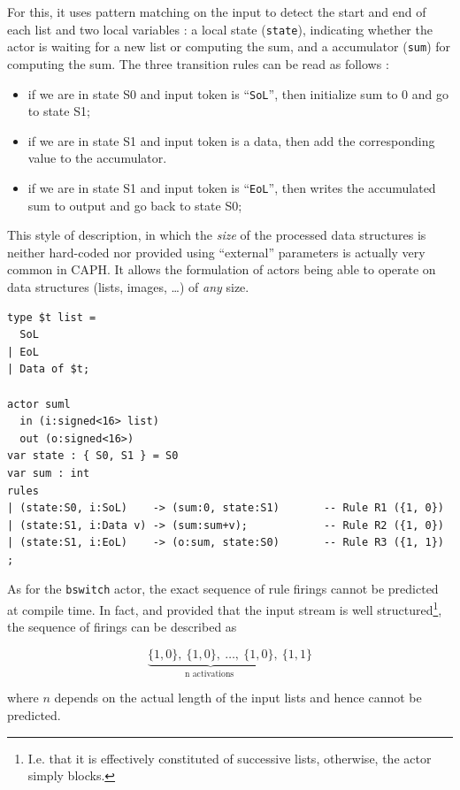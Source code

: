For this, it uses pattern
matching on the input to detect the start and end of each list and two local variables : a local
state (\texttt{state}), indicating whether the actor is waiting for a new list or computing the sum,
and a accumulator (\texttt{sum}) for computing the sum. The three transition rules can be read as
follows :
\begin{itemize}
\item if we are in state S0 and input token is ``\verb|SoL|'', then initialize sum to 0 and go to state S1;
\item if we are in state S1 and input token is a data, then add the corresponding value to the accumulator.
\item if we are in state S1 and input token is ``\verb|EoL|'', then writes the accumulated sum to output and
  go back to state S0;
\end{itemize}
This style of description, in which the \emph{size} of the processed data structures is neither
hard-coded nor provided using ``external'' parameters is actually very common in CAPH. It allows the
formulation of actors being able to operate on data structures (lists, images, \ldots) of \emph{any} size.

\begin{lstlisting}[caption={Another DDF actor},label=lst:suml-act2]
type $t list =
  SoL
| EoL
| Data of $t;

actor suml
  in (i:signed<16> list)
  out (o:signed<16>)
var state : { S0, S1 } = S0
var sum : int
rules 
| (state:S0, i:SoL)    -> (sum:0, state:S1)       -- Rule R1 ({1, 0})
| (state:S1, i:Data v) -> (sum:sum+v);            -- Rule R2 ({1, 0})
| (state:S1, i:EoL)    -> (o:sum, state:S0)       -- Rule R3 ({1, 1})
;
\end{lstlisting}

\medskip
As for the \verb|bswitch| actor, the exact sequence of rule firings cannot be predicted at compile
time. In fact, and provided that the input stream is well structured\footnote{I.e. that it is effectively constituted of successive
  lists, otherwise, the actor simply blocks.}, the sequence of firings can be described as 

\begin{equation*}
  \underbrace{\{1,0\},\ \{1,0\},\ \ldots,\ \{1,0\}}_{\text{n activations }},\ \{1,1\}
\end{equation*}

where $n$ depends on the actual length of the input lists and hence cannot be predicted.

